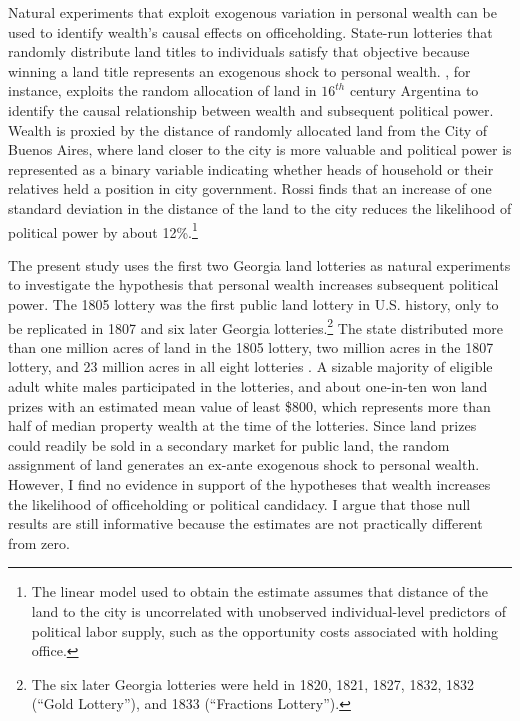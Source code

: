 Natural experiments that exploit exogenous variation in personal wealth can be used to identify wealth's causal effects on officeholding. State-run lotteries that randomly distribute land titles to individuals satisfy that objective because winning a land title represents an exogenous shock to personal wealth. \citet{rossi2014}, for instance, exploits the random allocation of land in $16^{th}$ century Argentina to identify the causal relationship between wealth and subsequent political power. Wealth is proxied by the distance of randomly allocated land from the City of Buenos Aires, where land closer to the city is more valuable and political power is represented as a binary variable indicating whether heads of household or their relatives held a position in city government. Rossi finds that an increase of one standard deviation in the distance of the land to the city reduces the likelihood of political power by about 12\%.\footnote{The linear model used to obtain the estimate assumes that distance of the land to the city is uncorrelated with unobserved individual-level predictors of political labor supply, such as the opportunity costs associated with holding office.}

The present study uses the first two Georgia land lotteries as natural experiments to investigate the hypothesis that personal wealth increases subsequent political power. The 1805 lottery was the first public land lottery in U.S. history, only to be replicated in 1807 and six later Georgia lotteries.\footnote{The six later Georgia lotteries were held in 1820, 1821, 1827, 1832, 1832 (``Gold Lottery''), and 1833 (``Fractions Lottery'').} The state distributed more than one million acres of land in the 1805 lottery, two million acres in the 1807 lottery, and 23 million acres in all eight lotteries \citep{cadle1991}. A sizable majority of eligible adult white males participated in the lotteries, and about one-in-ten won land prizes with an estimated mean value of least \$800, which represents more than half of median property wealth at the time of the lotteries. Since land prizes could readily be sold in a secondary market for public land, the random assignment of land generates an ex-ante exogenous shock to personal wealth. However, I find no evidence in support of the hypotheses that wealth increases the likelihood of officeholding or political candidacy. I argue that those null results are still informative because the estimates are not practically different from zero. 

